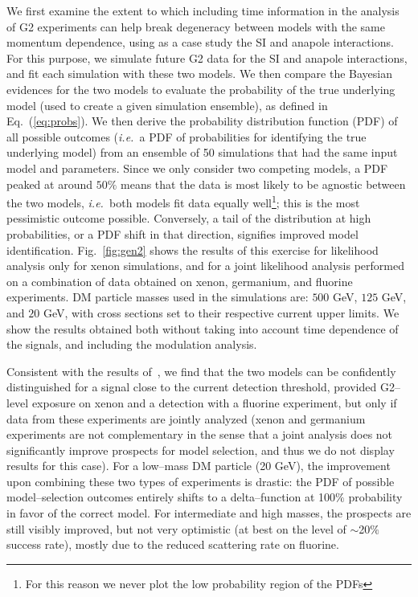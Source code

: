\documentclass[11pt]{article}
\newcommand{\ie}{{\it i.e.~}}  \newcommand{\eg}{{\it e.g.~}}
\newcommand{\Eq}[1]{Eq.~(\ref{#1})} \newcommand{\Eqs}[2]{Eqs.~(\ref{#1}) and (\ref{#2})} \newcommand{\Eqm}[2]{Eqs.~(\ref{#1}) through (\ref{#2})}
\newcommand{\Fig}[1]{Fig.~\ref{#1}} \newcommand{\Figs}[2]{Figs.~\ref{#1} and \ref{#2}}
\newcommand{\sjwColor}{red}
\newcommand{\sjw}[1]{{\color{\sjwColor} #1}}
\begin{document}
We first examine the extent to which including time information in the analysis of G2 experiments can help break degeneracy between models with the same momentum dependence, using as a case study the SI and anapole interactions. For this purpose, we simulate future G2 data for the SI and anapole interactions, and fit each simulation with these two models. We then compare the Bayesian evidences for the two models to evaluate the probability of the true underlying model (used to create a given simulation ensemble), as defined in \Eq{eq:probs}. We then derive the probability distribution function (PDF) of all possible outcomes (\ie a PDF of probabilities for identifying the true underlying model) from an ensemble of 50 simulations that had the same input model and parameters. Since we only consider two competing models, a PDF peaked at around $50\%$ means that the data is most likely to be agnostic between the two models, \ie both models fit data equally well\footnote{\sjw{For this reason we never plot the low probability region of the PDFs}}; this is the most pessimistic outcome possible. Conversely, a tail of the distribution at high probabilities, or a PDF shift in that direction, signifies improved model identification. \Fig{fig:gen2} shows the results of this exercise for likelihood analysis only for xenon simulations, and for a joint likelihood analysis performed on a combination of data obtained on xenon, germanium, and fluorine experiments.  DM particle masses used in the simulations are: $500$ GeV, $125$ GeV, and $20$ GeV, with cross sections set to their respective current upper limits. We show the results obtained both without taking into account time dependence of the signals, and including the modulation analysis. 


Consistent with the results of~\cite{Gluscevic:2015sqa}, we find that the two models can be confidently distinguished for a signal close to the current detection threshold, provided G2--level exposure on xenon and a detection with a fluorine experiment, but only if data from these experiments are jointly analyzed (xenon and germanium experiments are not complementary in the sense that a joint analysis does not significantly improve prospects for model selection, and thus we do not display results for this case). For a low--mass DM particle (20 GeV), the improvement upon combining these two types of experiments is drastic: the PDF of possible model--selection outcomes entirely shifts to a delta--function at 100$\%$ probability in favor of the correct model. For intermediate and high masses, the prospects are still visibly improved, but not very optimistic (at best on the level of $\sim$20$\%$ success rate), mostly due to the reduced scattering rate on fluorine.  
\end{document}
